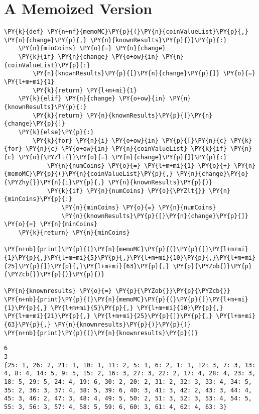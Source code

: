 \section{A Memoized Version}


\begin{Verbatim}[commandchars=\\\{\}]
\PY{k}{def} \PY{n+nf}{memoMC}\PY{p}{(}\PY{n}{coinValueList}\PY{p}{,} \PY{n}{change}\PY{p}{,} \PY{n}{knownResults}\PY{p}{)}\PY{p}{:}
    \PY{n}{minCoins} \PY{o}{=} \PY{n}{change}
    \PY{k}{if} \PY{n}{change} \PY{o+ow}{in} \PY{n}{coinValueList}\PY{p}{:}
        \PY{n}{knownResults}\PY{p}{[}\PY{n}{change}\PY{p}{]} \PY{o}{=} \PY{l+m+mi}{1}
        \PY{k}{return} \PY{l+m+mi}{1}
    \PY{k}{elif} \PY{n}{change} \PY{o+ow}{in} \PY{n}{knownResults}\PY{p}{:}
        \PY{k}{return} \PY{n}{knownResults}\PY{p}{[}\PY{n}{change}\PY{p}{]}
    \PY{k}{else}\PY{p}{:}
        \PY{k}{for} \PY{n}{i} \PY{o+ow}{in} \PY{p}{[}\PY{n}{c} \PY{k}{for} \PY{n}{c} \PY{o+ow}{in} \PY{n}{coinValueList} \PY{k}{if} \PY{n}{c} \PY{o}{\PYZlt{}}\PY{o}{=} \PY{n}{change}\PY{p}{]}\PY{p}{:}
            \PY{n}{numCoins} \PY{o}{=} \PY{l+m+mi}{1} \PY{o}{+} \PY{n}{memoMC}\PY{p}{(}\PY{n}{coinValueList}\PY{p}{,} \PY{n}{change}\PY{o}{\PYZhy{}}\PY{n}{i}\PY{p}{,} \PY{n}{knownResults}\PY{p}{)}
            \PY{k}{if} \PY{n}{numCoins} \PY{o}{\PYZlt{}} \PY{n}{minCoins}\PY{p}{:}
                \PY{n}{minCoins} \PY{o}{=} \PY{n}{numCoins}
                \PY{n}{knownResults}\PY{p}{[}\PY{n}{change}\PY{p}{]} \PY{o}{=} \PY{n}{minCoins}
    \PY{k}{return} \PY{n}{minCoins}

\PY{n+nb}{print}\PY{p}{(}\PY{n}{memoMC}\PY{p}{(}\PY{p}{[}\PY{l+m+mi}{1}\PY{p}{,}\PY{l+m+mi}{5}\PY{p}{,}\PY{l+m+mi}{10}\PY{p}{,}\PY{l+m+mi}{25}\PY{p}{]}\PY{p}{,}\PY{l+m+mi}{63}\PY{p}{,} \PY{p}{\PYZob{}}\PY{p}{\PYZcb{}}\PY{p}{)}\PY{p}{)}

\PY{n}{knownresults} \PY{o}{=} \PY{p}{\PYZob{}}\PY{p}{\PYZcb{}}
\PY{n+nb}{print}\PY{p}{(}\PY{n}{memoMC}\PY{p}{(}\PY{p}{[}\PY{l+m+mi}{1}\PY{p}{,} \PY{l+m+mi}{5}\PY{p}{,} \PY{l+m+mi}{10}\PY{p}{,} \PY{l+m+mi}{21}\PY{p}{,} \PY{l+m+mi}{25}\PY{p}{]}\PY{p}{,} \PY{l+m+mi}{63}\PY{p}{,} \PY{n}{knownresults}\PY{p}{)}\PY{p}{)}
\PY{n+nb}{print}\PY{p}{(}\PY{n}{knownresults}\PY{p}{)}
\end{Verbatim}

\begin{Verbatim}
6
3
{25: 1, 26: 2, 21: 1, 10: 1, 11: 2, 5: 1, 6: 2, 1: 1, 12: 3, 7: 3, 13: 4, 8: 4, 14: 5, 9: 5, 15: 2, 16: 3, 27: 3, 22: 2, 17: 4, 28: 4, 23: 3, 18: 5, 29: 5, 24: 4, 19: 6, 30: 2, 20: 2, 31: 2, 32: 3, 33: 4, 34: 5, 35: 2, 36: 3, 37: 4, 38: 5, 39: 6, 40: 3, 41: 3, 42: 2, 43: 3, 44: 4, 45: 3, 46: 2, 47: 3, 48: 4, 49: 5, 50: 2, 51: 3, 52: 3, 53: 4, 54: 5, 55: 3, 56: 3, 57: 4, 58: 5, 59: 6, 60: 3, 61: 4, 62: 4, 63: 3}

\end{Verbatim}



